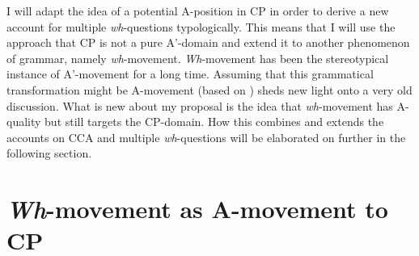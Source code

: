 \documentclass[output=paper,colorlinks,citecolor=brown]{langscibook}
\begin{document}
I will adapt the idea of a potential A-position in CP in order to derive a new account for multiple \textit{wh}-questions typologically. This means that I will use the approach that CP is not a pure A'-domain and extend it to another phenomenon of grammar, namely \textit{wh}-movement. \textit{Wh}-movement has been the stereotypical instance of A'-movement for a long time. Assuming that this grammatical transformation might be A-movement (based on \citealp{richards1997}) sheds new light onto a very old discussion. What is new about my proposal is the idea that \textit{wh}-movement has A-quality but still targets the CP-domain. How this combines and extends the accounts on CCA and multiple \textit{wh}-questions will be elaborated on further in the following section.

\section{\textit{Wh}-movement as A-movement to CP}
\end{document}

